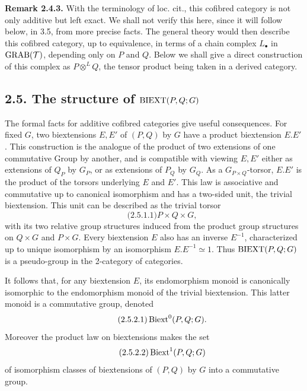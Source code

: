 \documentclass[11pt]{article}
\begin{document}
\textbf{Remark 2.4.3.}  With the terminology of loc. cit., this cofibred category is not only additive but left exact.  We shall not verify this here, since it will follow below, in 3.5, from more precise facts.  The general theory would then describe this cofibred category, up to equivalence, in terms of a chain complex \(L_\bullet\) in \(\operatorname{GRAB}(\mathcal T)\), depending only on \(P\) and \(Q\).  Below we shall give a direct construction of this complex as \(P\otimes^L Q\), the tensor product being taken in a derived category.

\subsection*{2.5. The structure of \(\operatorname{BIEXT}(P,Q;G)\)}
The formal facts for additive cofibred categories give useful consequences.  For fixed \(G\), two biextensions \(E,E'\) of \((P,Q)\) by \(G\) have a product biextension \(E.E'\).  This construction is the analogue of the product of two extensions of one commutative Group by another, and is compatible with viewing \(E,E'\) either as extensions of \(Q_P\) by \(G_P\), or as extensions of \(P_Q\) by \(G_Q\).  As a \(G_{P\times Q}\)-torsor, \(E.E'\) is the product of the torsors underlying \(E\) and \(E'\).  This law is associative and commutative up to canonical isomorphism and has a two-sided unit, the trivial biextension.  This unit can be described as the trivial torsor
\begin{equation}\qquad\text{(2.5.1.1)}
  P\times Q\times G,
\end{equation}
with its two relative group structures induced from the product group structures on \(Q\times G\) and \(P\times G\).  Every biextension \(E\) also has an inverse \(E^{-1}\), characterized up to unique isomorphism by an isomorphism \(E.E^{-1}\simeq1\).  Thus \(\operatorname{BIEXT}(P,Q;G)\) is a pseudo-group in the 2-category of categories.

It follows that, for any biextension \(E\), its endomorphism monoid is canonically isomorphic to the endomorphism monoid of the trivial biextension.  This latter monoid is a commutative group, denoted
\begin{equation}\qquad\text{(2.5.2.1)}
  \operatorname{Biext}^0(P,Q;G).
\end{equation}
Moreover the product law on biextensions makes the set
\begin{equation}\qquad\text{(2.5.2.2)}
  \operatorname{Biext}^1(P,Q;G)
\end{equation}
of isomorphism classes of biextensions of \((P,Q)\) by \(G\) into a commutative group.
\end{document}

